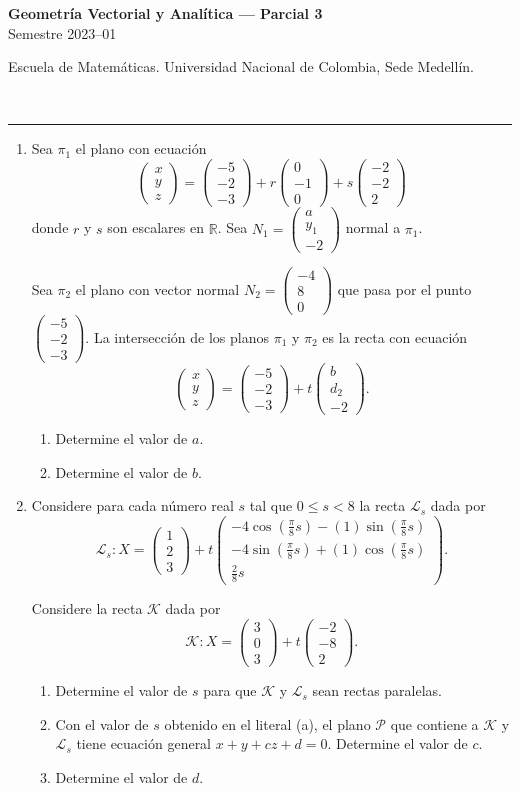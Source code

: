 \documentclass[11pt]{article}
\newcommand{\vectiii}[3]{\begin{pmatrix}#1\\#2\\#3\end{pmatrix}}
\begin{document}
\noindent
\begin{minipage}[t]{0.6\linewidth}
{\small\bfseries Geometría Vectorial y Analítica --- Parcial 3}\\
{\small Semestre 2023--01}
\end{minipage}%
\hfill
\begin{minipage}[t]{0.35\linewidth}
\raggedleft\small Escuela de Matemáticas. Universidad Nacional de Colombia, Sede Medellín.
\end{minipage}\\[2pt]
\rule{\linewidth}{0.6pt}

\begin{enumerate}
\item Sea $\pi_1$ el plano con ecuación
$$\vectiii{x}{y}{z}=\vectiii{-5}{-2}{-3}+r\vectiii{0}{-1}{0}+s\vectiii{-2}{-2}{2}$$
donde $r$ y $s$ son escalares en $\mathbb{R}$. Sea $N_1=\vectiii{a}{y_1}{-2}$ normal a $\pi_1$.

Sea $\pi_2$ el plano con vector normal $N_2=\vectiii{-4}{8}{0}$ que pasa por el punto $\vectiii{-5}{-2}{-3}$. La intersección de los planos $\pi_1$ y $\pi_2$ es la recta con ecuación
$$\vectiii{x}{y}{z}=\vectiii{-5}{-2}{-3}+t\vectiii{b}{d_2}{-2}.$$

\begin{enumerate}[label=(\alph*)]
\item Determine el valor de $a$.
\item Determine el valor de $b$.
\end{enumerate}

\item Considere para cada número real $s$ tal que $0\le s<8$ la recta $\mathcal{L}_s$ dada por
$$\mathcal{L}_s: X=\vectiii{1}{2}{3}+t\vectiii{-4\cos(\frac{\pi}{8}s)-(1)\sin(\frac{\pi}{8}s)}{-4\sin(\frac{\pi}{8}s)+(1)\cos(\frac{\pi}{8}s)}{\frac{2}{8}s}.$$

Considere la recta $\mathcal{K}$ dada por
$$\mathcal{K}: X=\vectiii{3}{0}{3}+t\vectiii{-2}{-8}{2}.$$

\begin{enumerate}[label=(\alph*)]
\item Determine el valor de $s$ para que $\mathcal{K}$ y $\mathcal{L}_s$ sean rectas paralelas.
\item Con el valor de $s$ obtenido en el literal (a), el plano $\mathcal{P}$ que contiene a $\mathcal{K}$ y $\mathcal{L}_s$ tiene ecuación general $x+y+cz+d=0$. Determine el valor de $c$.
\item Determine el valor de $d$.
\end{enumerate}


\end{enumerate}
\end{document}
